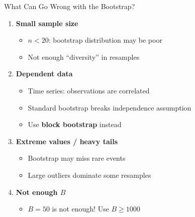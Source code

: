 \documentclass[aspectratio=169, 11pt]{beamer}
\begin{document}
\begin{frame}{What Can Go Wrong with the Bootstrap?}

\begin{enumerate}
  \item \textbf{Small sample size}
  \begin{itemize}
    \item[$\circ$] $n < 20$: bootstrap distribution may be poor
    \item[$\circ$] Not enough ``diversity'' in resamples
  \end{itemize}

  \vspace{0.3em}
  \item \textbf{Dependent data}
  \begin{itemize}
    \item[$\circ$] Time series: observations are correlated
    \item[$\circ$] Standard bootstrap breaks independence assumption
    \item[$\circ$] Use \textbf{block bootstrap} instead
  \end{itemize}

  \vspace{0.3em}
  \item \textbf{Extreme values / heavy tails}
  \begin{itemize}
    \item[$\circ$] Bootstrap may miss rare events
    \item[$\circ$] Large outliers dominate some resamples
  \end{itemize}

  \vspace{0.3em}
  \item \textbf{Not enough $B$}
  \begin{itemize}
    \item[$\circ$] $B = 50$ is not enough! Use $B \geq 1000$
  \end{itemize}
\end{enumerate}
\end{frame}
\end{document}
